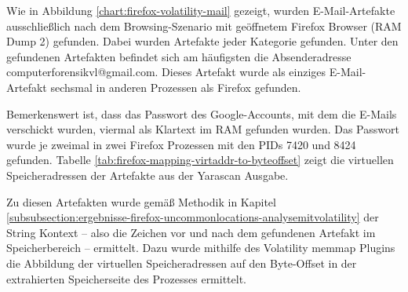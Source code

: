 Wie in Abbildung \ref{chart:firefox-volatility-mail} gezeigt, wurden E-Mail-Artefakte ausschließlich nach dem Browsing-Szenario mit geöffnetem Firefox Browser (RAM Dump 2) gefunden. Dabei wurden Artefakte jeder Kategorie gefunden.
Unter den gefundenen Artefakten befindet sich am häufigsten die Absenderadresse \grqq{}computerforensikvl@gmail.com\grqq{}. Dieses Artefakt wurde als einziges E-Mail-Artefakt sechsmal in anderen Prozessen als Firefox gefunden.

Bemerkenswert ist, dass das Passwort des Google-Accounts, mit dem die E-Mails verschickt wurden, viermal als Klartext im RAM gefunden wurden. Das Passwort wurde je zweimal in zwei Firefox Prozessen mit den PIDs 7420 und 8424 gefunden. Tabelle \ref{tab:firefox-mapping-virtaddr-to-byteoffset} zeigt die virtuellen Speicheradressen der Artefakte aus der Yarascan Ausgabe.
\begin{table}[h!]
\caption{Firefox: Abbildung der virtellen Speicheradressen der gefundenen Strings auf Byte-Offsets der entsprechenden Speicherseiten}
\label{tab:firefox-mapping-virtaddr-to-byteoffset}
\end{table}

Zu diesen Artefakten wurde gemäß Methodik in Kapitel \ref{subsubsection:ergebnisse-firefox-uncommonlocations-analysemitvolatility} der String Kontext -- also die Zeichen vor und nach dem gefundenen Artefakt im Speicherbereich -- ermittelt. Dazu wurde mithilfe des Volatility memmap Plugins die Abbildung der virtuellen Speicheradressen auf den Byte-Offset in der extrahierten Speicherseite des Prozesses ermittelt. 

